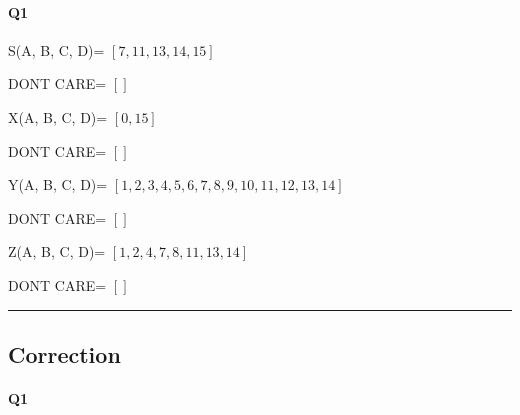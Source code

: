 \paragraph{Q1}


S(A, B, C, D)= $[7, 11, 13, 14, 15]$

DONT CARE= $[]$

X(A, B, C, D)= $[0, 15]$

DONT CARE= $[]$

Y(A, B, C, D)= $[1, 2, 3, 4, 5, 6, 7, 8, 9, 10, 11, 12, 13, 14]$

DONT CARE= $[]$

Z(A, B, C, D)= $[1, 2, 4, 7, 8, 11, 13, 14]$

DONT CARE= $[]$



\hrule width 1\linewidth
\pagebreak

\subsection{Correction}


\paragraph{Q1}


